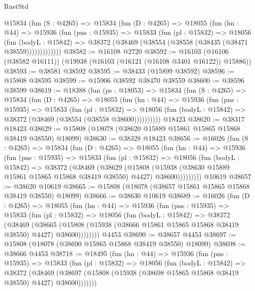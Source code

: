 \begin{lexlean}{RustStd}
\begin{coremodule}
      @15834
        (fun (S : @4265) =>
        @15834
          (fun (D : @4265) =>
          @18055
            (fun (hn : @44) =>
            @15936
              (fun (pns : @15935) =>
              @15833
                (fun (pl : @15832) =>
                @18056
                  (fun (bodyL : @15842) =>
                  @38372 (@38469 (@38554 (@38558 (@38435 (@38471 @38559)))))))))))))
@38582 := @16108 @2720
@38592 := @16103 (@16106 (@38582 @16111)) (@19938 (@16103 (@16121 (@16108 @3401 @16122)) @15886))
@38593 := @38581 @38592
@38595 := @38433 (@15899 @38592)
@38596 := @15808 @38595
@38599 := @15906 @38592 @38470 @38559
@38600 := @38596 @38599
@38619 := @18388
    (fun (ps : @18053) =>
    @15834
      (fun (S : @4265) =>
      @15834
        (fun (D : @4265) =>
        @18055
          (fun (hn : @44) =>
          @15936
            (fun (pns : @15935) =>
            @15833
              (fun (pl : @15832) =>
              @18056 (fun (bodyL : @15842) => @38372 (@38469 (@38554 (@38558 @38600))))))))))
    @18423
@38620 := @38317 @18423
@38629 := @15808 (@18078 (@38620 @15889 @15861 @15865 @15868 @38419 @38550) @18099)
@38630 := @38328 @18423
@38656 := @16026
    (fun (S : @4265) =>
    @15834
      (fun (D : @4265) =>
      @18055
        (fun (hn : @44) =>
        @15936
          (fun (pns : @15935) =>
          @15833
            (fun (pl : @15832) =>
            @18056
              (fun (bodyL : @15842) =>
              @38372
                (@38469
                  (@38629
                    (@15808
                      (@15938 (@38630 @15889 @15861 @15865 @15868 @38419 @38550) @4427)
                      @38600)))))))))
    @10619
@38657 := @38620 @10619
@38665 := @15808 (@18078 (@38657 @15861 @15865 @15868 @38419 @38550) @18099)
@38666 := @38630 @10619
@38689 := @16026
    (fun (D : @4265) =>
    @18055
      (fun (hn : @44) =>
      @15936
        (fun (pns : @15935) =>
        @15833
          (fun (pl : @15832) =>
          @18056
            (fun (bodyL : @15842) =>
            @38372
              (@38469
                (@38665
                  (@15808 (@15938 (@38666 @15861 @15865 @15868 @38419 @38550) @4427) @38600))))))))
    @4453
@38690 := @38657 @4453
@38697 := @15808 (@18078 (@38690 @15865 @15868 @38419 @38550) @18099)
@38698 := @38666 @4453
@38718 := @18495
    (fun (hn : @44) =>
    @15936
      (fun (pns : @15935) =>
      @15833
        (fun (pl : @15832) =>
        @18056
          (fun (bodyL : @15842) =>
          @38372
            (@38469
              (@38697 (@15808 (@15938 (@38698 @15865 @15868 @38419 @38550) @4427) @38600)))))))

\end{coremodule}
\end{lexlean}
